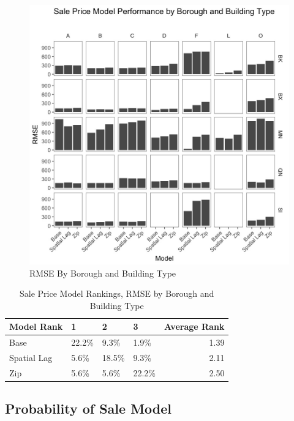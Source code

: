 \documentclass[12pt,]{article}
\begin{document}
\begin{figure}[H]
\includegraphics[width=1\linewidth]{Sections/tables and figures/RMSE by boro and build type} \caption{RMSE By Borough and Building Type}\label{fig:RMSE by boro and build type}
\end{figure}

\begin{table}

\caption{\label{tab:Sale Price Model Rank Distributions}\label{tab:SalePriceModelRank} Sale Price Model Rankings, RMSE by Borough and Building Type}
\centering
\begin{tabular}[t]{llllr}
\toprule
Model Rank & 1 & 2 & 3 & Average Rank\\
\midrule
Base & 22.2\% & 9.3\% & 1.9\% & 1.39\\
Spatial Lag & 5.6\% & 18.5\% & 9.3\% & 2.11\\
Zip & 5.6\% & 5.6\% & 22.2\% & 2.50\\
\bottomrule
\end{tabular}
\end{table}

\hypertarget{probability-of-sale-model}{%
\subsection{Probability of Sale Model}\label{probability-of-sale-model}}
\end{document}
